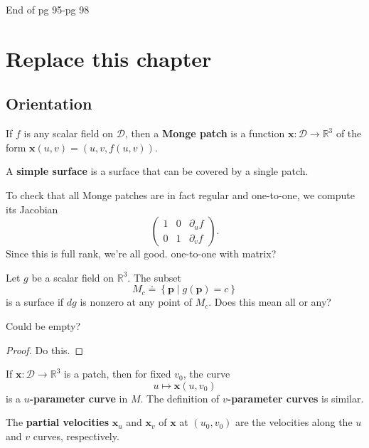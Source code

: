 \documentclass[10pt]{report}
\begin{document}
{\color{red}End of pg 95-pg 98}


\chapter{Replace this chapter}


\section{Orientation}

\begin{defn}[]
	If $f$ is any scalar field on $\mathcal{D}$, then a \textbf{Monge patch} is a function $\mathbf{x}:\mathcal{D}\to \mathbb{R}^3$ of the form $\mathbf{x}(u,v)=(u,v,f(u,v))$.

	A \textbf{simple surface} is a surface that can be covered by a single patch.
\end{defn}

To check that all Monge patches are in fact regular and one-to-one, we compute its Jacobian
\[
\begin{pmatrix}
	1 & 0 & \partial_{u}{f} \\
	0 & 1 & \partial_{v}{f} 
\end{pmatrix}.
\] Since this is full rank, we're all good. {\color{red}one-to-one with matrix?}

\begin{thrm}[]
	Let $g$ be a scalar field on $\mathbb{R}^3$. The subset \[M_c \doteq \left\{ \mathbf{p} \;|\; g(\mathbf{p})=c \right\}\] is a surface if $dg$ is nonzero at any point of $M_c$. {\color{red}Does this mean all or any?}

	{\color{red}Could be empty?}
\end{thrm}
\begin{proof}
	{\color{red}Do this.}
\end{proof}

If $\mathbf{x}:\mathcal{D}\to \mathbb{R}^3$ is a patch, then for fixed $v_0$, the curve
\[u\mapsto \mathbf{x}(u,v_0)\] is a \textbf{$u$-parameter curve} in $M$. The definition of \textbf{$v$-parameter curves} is similar.

\begin{defn}[]
	The \textbf{partial velocities} $\mathbf{x}_{u}$ and $\mathbf{x}_{v}$ of $\mathbf{x}$ at $(u_0,v_0)$ are the velocities along the $u$ and $v$ curves, respectively.
\end{defn}
\end{document}
